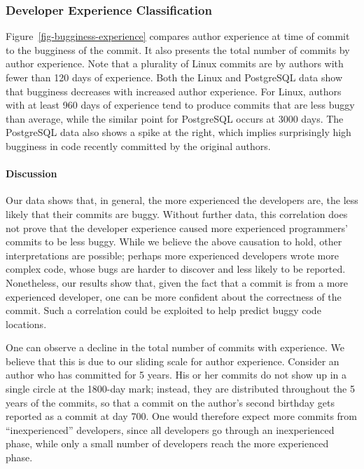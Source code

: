 \subsubsection{Developer Experience Classification}
\label{sec-dev-exp}

Figure~\ref{fig-bugginess-experience} compares author experience at time of
commit to the bugginess of the commit. It also presents the total number of
commits by author experience. Note that a plurality of Linux commits are by
authors with fewer than 120 days of experience. Both the Linux and PostgreSQL
data show that bugginess decreases with increased author experience. For Linux,
authors with at least 960 days of experience tend to produce commits that are
less buggy than average, while the similar point for PostgreSQL occurs at 3000
days. The PostgreSQL data also shows a spike at the right, which implies
surprisingly high bugginess in code recently committed by the original authors.

\paragraph{Discussion}

Our data shows that, in general, the more experienced the developers are, the
less likely that their commits are buggy. Without further data, this
correlation does not prove that the developer experience caused more experienced
programmers' commits to be less buggy. While we believe the above causation to
hold, other interpretations are possible; perhaps more experienced developers
wrote more complex code, whose bugs are harder to discover and less likely to be
reported. Nonetheless, our results show that, given the fact that a commit is
from a more experienced developer, one can be more confident about the
correctness of the commit. Such a correlation could be exploited to help predict
buggy code locations.

One can observe a decline in the total number of commits with experience.
We believe that this is due to our sliding scale for author experience.
Consider an author who has committed for 5 years. His or her commits do not
show up in a single circle at the 1800-day mark; instead, they are distributed
throughout the 5 years of the commits, so that a commit on the author's second
birthday gets reported as a commit at day 700. One would therefore expect
more commits from ``inexperienced'' developers, since all developers go through
an inexperienced phase, while only a small number of developers reach the
more experienced phase.

